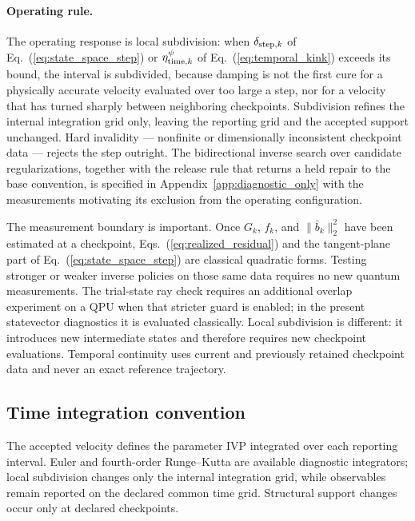 \documentclass[
  reprint,
  amsmath,
  amssymb,
  aps,
  pra,
  nofootinbib,
  superscriptaddress,
  floatfix
]{revtex4-2}
\begin{document}
\paragraph*{Operating rule.}  The operating response is local subdivision: when \(\delta_{{\rm step},k}\) of Eq.~(\ref{eq:state_space_step}) or \(\eta_{{\rm time},k}^{\psi}\) of Eq.~(\ref{eq:temporal_kink}) exceeds its bound, the interval is subdivided, because damping is not the first cure for a physically accurate velocity evaluated over too large a step, nor for a velocity that has turned sharply between neighboring checkpoints.  Subdivision refines the internal integration grid only, leaving the reporting grid and the accepted support unchanged.  Hard invalidity --- nonfinite or dimensionally inconsistent checkpoint data --- rejects the step outright.  The bidirectional inverse search over candidate regularizations, together with the release rule that returns a held repair to the base convention, is specified in Appendix~\ref{app:diagnostic_only} with the measurements motivating its exclusion from the operating configuration.

The measurement boundary is important.  Once \(G_k\), \(f_k\), and \(\|\bar b_k\|_2^2\) have been estimated at a checkpoint, Eqs.~(\ref{eq:realized_residual}) and the tangent-plane part of Eq.~(\ref{eq:state_space_step}) are classical quadratic forms.  Testing stronger or weaker inverse policies on those same data requires no new quantum measurements.  The trial-state ray check requires an additional overlap experiment on a QPU when that stricter guard is enabled; in the present statevector diagnostics it is evaluated classically.  Local subdivision is different: it introduces new intermediate states and therefore requires new checkpoint evaluations.  Temporal continuity uses current and previously retained checkpoint data and never an exact reference trajectory.



\subsection{Time integration convention}

The accepted velocity defines the parameter IVP integrated over each reporting interval.  Euler and fourth-order Runge--Kutta are available diagnostic integrators; local subdivision changes only the internal integration grid, while observables remain reported on the declared common time grid.  Structural support changes occur only at declared checkpoints.
\end{document}
